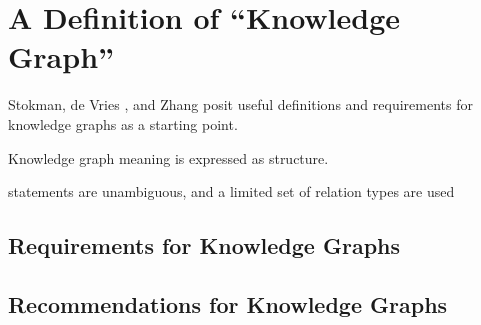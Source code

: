 \section{A Definition of ``Knowledge Graph''}

Stokman,  de Vries \cite{Stokman_1988}, and Zhang \cite{zhang2002knowledge} posit useful definitions and requirements for knowledge graphs as a starting point.

\begin {definition}
Knowledge graph meaning is expressed as structure.
\end {definition}

\begin {definition}
statements are unambiguous, and a limited set of relation types are used
\end {definition}

\subsection{Requirements for Knowledge Graphs}

\subsection{Recommendations for Knowledge Graphs}